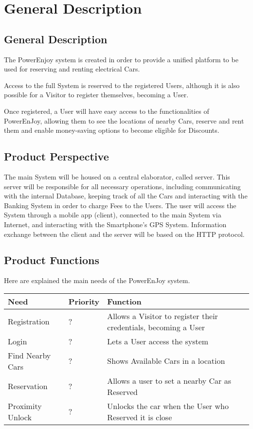 \section{General Description}
\subsection{General Description}
The PowerEnjoy system is created in order to provide a unified platform to be used for reserving and renting electrical Cars.

Access to the full System is reserved to the registered Users, although it is also possible for a Visitor to register themselves, becoming a User.

Once registered, a User will have easy access to the functionalities of PowerEnJoy, allowing them to see the locations of nearby Cars, reserve and rent them and enable money-saving options to become eligible for Discounts.

\subsection{Product Perspective}
The main System will be housed on a central elaborator, called server. This server will be responsible for all necessary operations, including communicating with the internal Database, keeping track of all the Cars and interacting with the Banking System in order to charge Fees to the Users.
The user will access the System through a mobile app (client), connected to the main System via Internet, and interacting with the Smartphone's GPS System. Information exchange between the client and the server will be based on the HTTP protocol.

\subsection{Product Functions}
Here are explained the main needs of the PowerEnJoy system.
\begin{center}
  \begin{tabular}{|p{}|p{}|p{}|}
    \hline
    \textbf{Need} & \textbf{Priority} & \textbf{Function} \\ \hline
    Registration & ? & Allows a Visitor to register their credentials, becoming a User \\ \hline
    Login & ? & Lets a User access the system \\ \hline
    Find Nearby Cars & ? & Shows Available Cars in a location \\ \hline
    Reservation & ? & Allows a user to set a nearby Car as Reserved \\ \hline
    Proximity Unlock & ? & Unlocks the car when the User who Reserved it is close \\ \hline
  \end{tabular}
\end{center}

